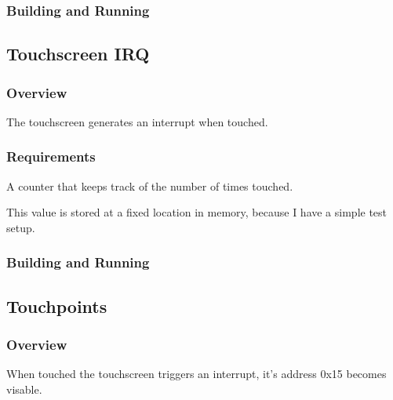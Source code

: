 \documentclass[letterpaper,10pt,english]{sphinxmanual}
\begin{document}
\subsubsection{Building and Running}
\label{\detokenize{samples/basic/scani2c/README:building-and-running}}

\subsection{Touchscreen IRQ}
\label{\detokenize{samples/basic/testirq/README:touchscreen-irq}}\label{\detokenize{samples/basic/testirq/README:testirq}}\label{\detokenize{samples/basic/testirq/README::doc}}

\subsubsection{Overview}
\label{\detokenize{samples/basic/testirq/README:overview}}
The touchscreen generates an interrupt when touched.


\subsubsection{Requirements}
\label{\detokenize{samples/basic/testirq/README:requirements}}
A counter that keeps track of the number of times touched.

This value is stored at a fixed location in memory, because I have a simple test setup.


\subsubsection{Building and Running}
\label{\detokenize{samples/basic/testirq/README:building-and-running}}

\subsection{Touchpoints}
\label{\detokenize{samples/basic/touchpoints/README:touchpoints}}\label{\detokenize{samples/basic/touchpoints/README:id1}}\label{\detokenize{samples/basic/touchpoints/README::doc}}

\subsubsection{Overview}
\label{\detokenize{samples/basic/touchpoints/README:overview}}
When touched the touchscreen triggers an interrupt,
it’s address 0x15 becomes visable.
\end{document}
